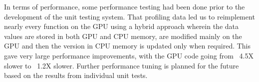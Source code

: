 \documentclass[12pt]{article}
\begin{document}
In terms of performance, some performance testing had been done prior to the development of the unit testing system. That profiling data led us to reimplement nearly every function on the GPU using a hybrid approach wherein the data values are stored in both GPU and CPU memory, are modified mainly on the GPU and then the version in CPU memory is updated only when required. This gave very large performance improvements, with the GPU code going from ~4.5X slower to ~1.2X slower. Further performance tuning is planned for the future based on the results from individual unit tests.
\end{document}
